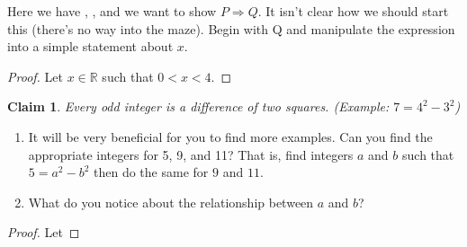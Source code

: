 \documentclass[12 pt]{article}
\newcommand{\R}{\mathbb{R}}
\theoremstyle{definition}
\theoremstyle{plain}
\theoremstyle{mytheorem}
\newtheorem{claim}{Claim}
\theoremstyle{myexample}
\theoremstyle{mydefinition}
\begin{document}
Here we have , , and we want to show $P \Rightarrow Q$.  It isn't clear how we should start this (there's no way into the maze).  Begin with Q and manipulate the expression into a simple statement about $x$.
	\vspace{4in}


\begin{proof}  Let $x \in \R$ such that $0<x<4$.

\vspace{2.75in}

\end{proof}

\newpage

\begin{claim} Every odd integer is a difference of two squares.  (Example: $7=4^2-3^2$)
\end{claim}

	\begin{enumerate}[label=(\alph*)]
	\item It will be very beneficial for you to find more examples.  Can you find the appropriate integers for 5, 9, and 11?  That is, find integers $a$ and $b$ such that $5 = a^2-b^2$ then do the same for $9$ and $11$.
	\vspace{2in}
	\item What do you notice about the relationship between $a$ and $b$?
	\vspace{1in}
	\end{enumerate}

\begin{proof} Let

\vspace{3.65in}
\end{proof}
\end{document}

